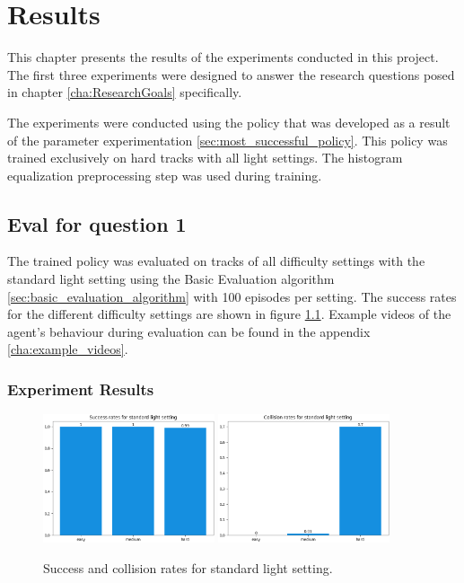 \chapter{Results}
\label{cha:Results}

This chapter presents the results of the experiments conducted in this project. The first three experiments were designed to answer the research questions posed in chapter \ref{cha:ResearchGoals} specifically. 

The experiments were conducted using the policy that was developed as a result of the parameter experimentation \ref{sec:most_successful_policy}. This policy was trained exclusively on hard tracks with all light settings. The histogram equalization preprocessing step was used during training.


\section{Eval for question 1}

The trained policy was evaluated on tracks of all difficulty settings with the standard light setting using the Basic Evaluation algorithm \ref{sec:basic_evaluation_algorithm} with 100 episodes per setting. The success rates for the different difficulty settings are shown in figure \ref{fig:result_success_rates_standard}. Example videos of the agent's behaviour during evaluation can be found in the appendix \ref{cha:example_videos}.

\subsection{Experiment Results}

\begin{figure}
    \centering
    \includegraphics[width=0.45\textwidth]{Bilder/notebook_images/hardDistanceMixedLight_eval_standard_success_rates_barplot.png}
    \includegraphics[width=0.45\textwidth]{Bilder/notebook_images/hardDistanceMixedLight_eval_standard_collision_rates_barplot.png}
    \caption{Success and collision rates for standard light setting.}
    \label{fig:result_success_rates_standard}
\end{figure}


